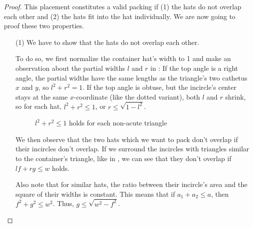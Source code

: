 \documentclass[%
    a4paper,              %
    style=screen,          %
    bibliography=totoc,   %
    nexus,                %
    lnum,                 %
    extramargin,          %
]{tubsbook}
\newcommand\defaulta{30}
\newcommand\defaultb{40}
\newcommand\defaultx{0.6}
\begin{document}
\begin{proof}
    This placement constitutes a valid packing if (1) the hats do not overlap each other and (2) the hats fit into the hat individually. We are now going to proof these two properties.

    \begin{itemize}
        \item[(1)]
            We have to show that the hats do not overlap each other.

            To do so, we first normalize the container hat's width to 1 and make an observation about the partial widths $l$ and $r$ in : If the top angle is a right angle, the partial widths have the same lengths as the triangle's two cathetus $x$ and $y$, so $l^2 + r^2 = 1$. If the top angle is obtuse, but the incircle's center stays at the same $x$-coordinate (like the dotted variant), both $l$ and $r$ shrink, so for each hat, $l^2 + r^2 \le 1$, or $r \le \sqrt{1-l^2}$.

            \begin{figure}[htbp!]
                \centering


                \caption{$l^2 + r^2 \le 1$ holds for each non-acute triangle}
                \label{fig:hatlr}
            \end{figure}

            We then observe that the two hats which we want to pack don't overlap if their incircles don't overlap. If we surround the incircles with triangles similar to the container's triangle, like in , we can see that they don't overlap if $lf + rg \le w$ holds.

            Also note that for similar hats, the ratio between their incircle's area and the square of their widths is constant. This means that if $a_1 + a_2 \le a$, then $f^2 + g^2 \le w^2$. Thus, $g \le \sqrt{w^2-f^2}$.

            \begin{figure}[htbp!]
                \centering



\end{figure}
\end{itemize}
\end{proof}
\end{document}

